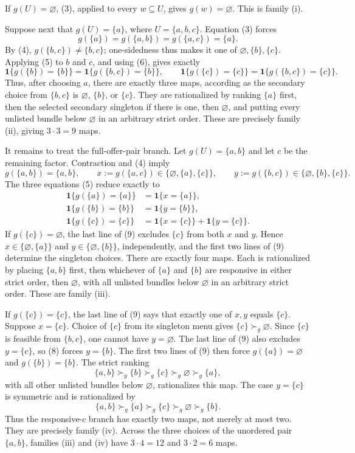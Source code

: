 If \(g(U)=\varnothing\), (3), applied to every \(w\subseteq U\), gives \(g(w)=\varnothing\).  This is family (i).

Suppose next that \(g(U)=\{a\}\), where \(U=\{a,b,c\}\).  Equation (3) forces
\[
g(\{a\})=g(\{a,b\})=g(\{a,c\})=\{a\}. \tag{6}
\]
By (4), \(g(\{b,c\})\ne\{b,c\}\); one-sidedness thus makes it one of \(\varnothing,\{b\},\{c\}\).  Applying (5) to \(b\) and \(c\), and using (6), gives exactly
\[
\mathbf 1\{g(\{b\})=\{b\}\}
=\mathbf 1\{g(\{b,c\})=\{b\}\},
\qquad
\mathbf 1\{g(\{c\})=\{c\}\}
=\mathbf 1\{g(\{b,c\})=\{c\}\}. \tag{7}
\]
Thus, after choosing \(a\), there are exactly three maps, according as the secondary choice from \(\{b,c\}\) is \(\varnothing\), \(\{b\}\), or \(\{c\}\).  They are rationalized by ranking \(\{a\}\) first, then the selected secondary singleton if there is one, then \(\varnothing\), and putting every unlisted bundle below \(\varnothing\) in an arbitrary strict order.  These are precisely family (ii), giving \(3\cdot3=9\) maps.

It remains to treat the full-offer-pair branch.  Let \(g(U)=\{a,b\}\) and let \(c\) be the remaining factor.  Contraction and (4) imply
\[
g(\{a,b\})=\{a,b\},\qquad
x:=g(\{a,c\})\in\{\varnothing,\{a\},\{c\}\},\qquad
y:=g(\{b,c\})\in\{\varnothing,\{b\},\{c\}\}. \tag{8}
\]
The three equations (5) reduce exactly to
\[
\begin{aligned}
\mathbf 1\{g(\{a\})=\{a\}\}&=\mathbf 1\{x=\{a\}\},\\
\mathbf 1\{g(\{b\})=\{b\}\}&=\mathbf 1\{y=\{b\}\},\\
\mathbf 1\{g(\{c\})=\{c\}\}&=\mathbf 1\{x=\{c\}\}+\mathbf 1\{y=\{c\}\}.
\end{aligned} \tag{9}
\]
If \(g(\{c\})=\varnothing\), the last line of (9) excludes \(\{c\}\) from both \(x\) and \(y\).  Hence \(x\in\{\varnothing,\{a\}\}\) and \(y\in\{\varnothing,\{b\}\}\), independently, and the first two lines of (9) determine the singleton choices.  There are exactly four maps.  Each is rationalized by placing \(\{a,b\}\) first, then whichever of \(\{a\}\) and \(\{b\}\) are responsive in either strict order, then \(\varnothing\), with all unlisted bundles below \(\varnothing\) in an arbitrary strict order.  These are family (iii).

If \(g(\{c\})=\{c\}\), the last line of (9) says that exactly one of \(x,y\) equals \(\{c\}\).  Suppose \(x=\{c\}\).  Choice of \(\{c\}\) from its singleton menu gives \(\{c\}\succ_g\varnothing\).  Since \(\{c\}\) is feasible from \(\{b,c\}\), one cannot have \(y=\varnothing\).  The last line of (9) also excludes \(y=\{c\}\), so (8) forces \(y=\{b\}\).  The first two lines of (9) then force \(g(\{a\})=\varnothing\) and \(g(\{b\})=\{b\}\).  The strict ranking
\[
\{a,b\}\succ_g\{b\}\succ_g\{c\}\succ_g\varnothing\succ_g\{a\}, \tag{10}
\]
with all other unlisted bundles below \(\varnothing\), rationalizes this map.  The case \(y=\{c\}\) is symmetric and is rationalized by
\[
\{a,b\}\succ_g\{a\}\succ_g\{c\}\succ_g\varnothing\succ_g\{b\}. \tag{11}
\]
Thus the responsive-\(c\) branch has exactly two maps, not merely at most two.  They are precisely family (iv).  Across the three choices of the unordered pair \(\{a,b\}\), families (iii) and (iv) have \(3\cdot4=12\) and \(3\cdot2=6\) maps.

